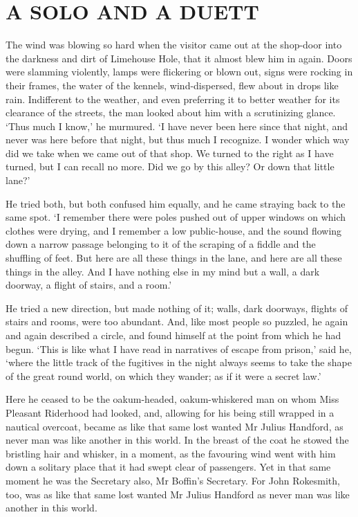 
\chapter{A SOLO AND A DUETT}

The wind was blowing so hard when the visitor came out at the shop-door
into the darkness and dirt of Limehouse Hole, that it almost blew him
in again. Doors were slamming violently, lamps were flickering or blown
out, signs were rocking in their frames, the water of the kennels,
wind-dispersed, flew about in drops like rain. Indifferent to the
weather, and even preferring it to better weather for its clearance of
the streets, the man looked about him with a scrutinizing glance. ‘Thus
much I know,’ he murmured. ‘I have never been here since that night, and
never was here before that night, but thus much I recognize. I wonder
which way did we take when we came out of that shop. We turned to the
right as I have turned, but I can recall no more. Did we go by this
alley? Or down that little lane?’

He tried both, but both confused him equally, and he came straying
back to the same spot. ‘I remember there were poles pushed out of upper
windows on which clothes were drying, and I remember a low public-house,
and the sound flowing down a narrow passage belonging to it of the
scraping of a fiddle and the shuffling of feet. But here are all these
things in the lane, and here are all these things in the alley. And I
have nothing else in my mind but a wall, a dark doorway, a flight of
stairs, and a room.’

He tried a new direction, but made nothing of it; walls, dark doorways,
flights of stairs and rooms, were too abundant. And, like most people so
puzzled, he again and again described a circle, and found himself at
the point from which he had begun. ‘This is like what I have read in
narratives of escape from prison,’ said he, ‘where the little track of
the fugitives in the night always seems to take the shape of the great
round world, on which they wander; as if it were a secret law.’

Here he ceased to be the oakum-headed, oakum-whiskered man on whom Miss
Pleasant Riderhood had looked, and, allowing for his being still wrapped
in a nautical overcoat, became as like that same lost wanted Mr Julius
Handford, as never man was like another in this world. In the breast of
the coat he stowed the bristling hair and whisker, in a moment, as the
favouring wind went with him down a solitary place that it had swept
clear of passengers. Yet in that same moment he was the Secretary also,
Mr Boffin’s Secretary. For John Rokesmith, too, was as like that same
lost wanted Mr Julius Handford as never man was like another in this
world.

